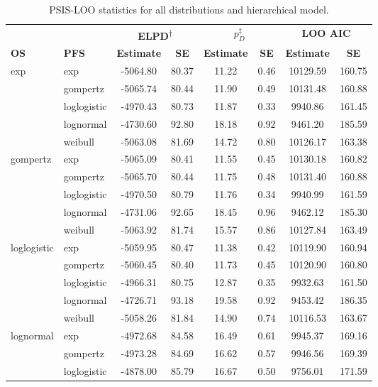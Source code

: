 \documentclass[AMA,STIX1COL]{WileyNJD-v2}
\begin{document}
\begin{table}[H]
\caption{PSIS-LOO statistics for all distributions and hierarchical model. \label{tab:loo_hier}}
\centering
\begin{tabular}{l l c c c c c c}
\toprule
\multicolumn{1}{l}{} & \multicolumn{1}{l}{} & \multicolumn{2}{c}{\textbf{ELPD\textsuperscript{$\dagger$}}} & \multicolumn{2}{c}{\textbf{$p_D^{\ddagger}$}} & \multicolumn{2}{c}{\textbf{LOO AIC}} \\
\cmidrule{3-4}\cmidrule{5-6}\cmidrule{7-8}
\textbf{OS} & \textbf{PFS} & \textbf{Estimate} & \textbf{SE} & \textbf{Estimate} & \textbf{SE} & \textbf{Estimate} & \textbf{SE}\\
\midrule
exp & exp & -5064.80 & 80.37 & 11.22 & 0.46 & 10129.59 & 160.75\\
 & gompertz & -5065.74 & 80.44 & 11.90 & 0.49 & 10131.48 & 160.88\\
 & loglogistic & -4970.43 & 80.73 & 11.87 & 0.33 & 9940.86 & 161.45\\
 & lognormal & -4730.60 & 92.80 & 18.18 & 0.92 & 9461.20 & 185.59\\
 & weibull & -5063.08 & 81.69 & 14.72 & 0.80 & 10126.17 & 163.38\\
gompertz & exp & -5065.09 & 80.41 & 11.55 & 0.45 & 10130.18 & 160.82\\
 & gompertz & -5065.70 & 80.44 & 11.75 & 0.48 & 10131.40 & 160.88\\
 & loglogistic & -4970.50 & 80.79 & 11.76 & 0.34 & 9940.99 & 161.59\\
 & lognormal & -4731.06 & 92.65 & 18.45 & 0.96 & 9462.12 & 185.30\\
 & weibull & -5063.92 & 81.74 & 15.57 & 0.86 & 10127.84 & 163.49\\
loglogistic & exp & -5059.95 & 80.47 & 11.38 & 0.42 & 10119.90 & 160.94\\
 & gompertz & -5060.45 & 80.40 & 11.73 & 0.45 & 10120.90 & 160.80\\
 & loglogistic & -4966.31 & 80.75 & 12.87 & 0.35 & 9932.63 & 161.50\\
 & lognormal & -4726.71 & 93.18 & 19.58 & 0.92 & 9453.42 & 186.35\\
 & weibull & -5058.26 & 81.84 & 14.90 & 0.74 & 10116.53 & 163.67\\
lognormal & exp & -4972.68 & 84.58 & 16.49 & 0.61 & 9945.37 & 169.16\\
 & gompertz & -4973.28 & 84.69 & 16.62 & 0.57 & 9946.56 & 169.39\\
 & loglogistic & -4878.00 & 85.79 & 16.67 & 0.50 & 9756.01 & 171.59\\

\end{tabular}
\end{table}
\end{document}
